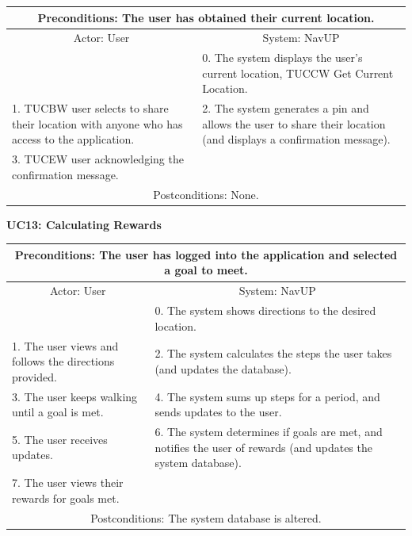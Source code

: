 \documentclass{article}
\begin{document}
       		 \begin{tabular}{|p{6cm}|p{6cm}|}
       		 \hline
       		\multicolumn{2}{c}{ Preconditions: The user has obtained their current location.} \\
       		 \hline
       		 \multicolumn{1}{c}{Actor: User} & \multicolumn{1}{c}{ System: NavUP} \\
        		\hline
       		  & 0.	The system displays the user's current location, TUCCW Get Current Location.\\
       		 \hline
       		 1.	TUCBW user selects to share their location with anyone who has access to the application. & 2.	The system generates a pin and allows the user to share their location (and displays a confirmation message).\\
        		\hline
       		3.	TUCEW user acknowledging the confirmation message. &\\
       		 \hline
        		\multicolumn{2}{c}{Postconditions: None.} \\
        		\hline
        \end{tabular} 
      

				\vspace{5mm}
                \begin{flushleft}
				\textbf{UC13: Calculating Rewards}\\
				\end{flushleft}
        		\centering	
       		 \small
       		 \begin{tabular}{|p{6cm}|p{6cm}|}
       		 \hline
       		 \multicolumn{2}{c}{Preconditions: The user has logged into the application and selected a goal to meet.} \\
       		 \hline
       		 \multicolumn{1}{c}{Actor: User} & \multicolumn{1}{c}{ System: NavUP} \\
        		\hline
       		 & 0.	The system shows directions to the desired location.\\
       		 \hline
       		 1.	The user views and follows the directions provided. & 2.	The system calculates the steps the user takes (and updates the database).\\
        		\hline
       		 3.	The user keeps walking until a goal is met. & 4.	The system sums up steps for a period, and sends updates to the user.\\
        		\hline
       		 5.	The user receives updates. & 6.	The system determines if goals are met, and notifies the user of rewards (and updates the system database).\\
        		\hline
        		7.	The user views their rewards for goals met. & \\
       		 \hline
        		\multicolumn{2}{c}{Postconditions: The system database is altered. } \\
        		\hline
        \end{tabular} 
        
\end{document}
